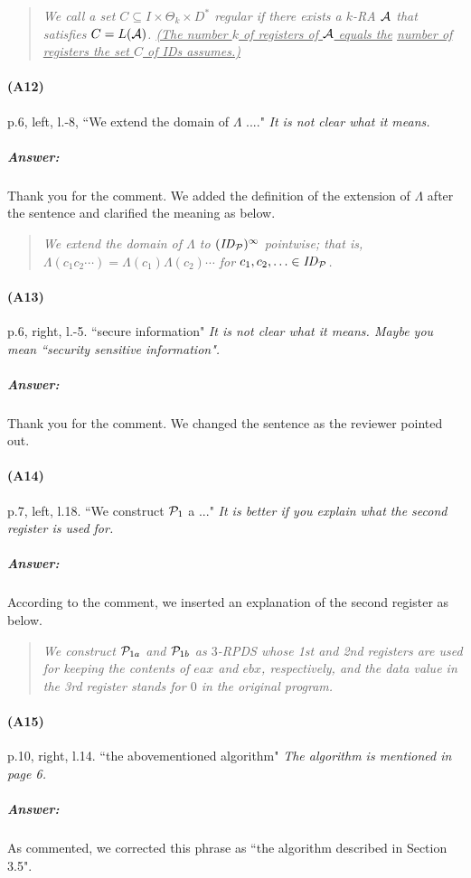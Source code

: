 \documentclass{article}
\begin{document}
\begin{quote}\em
We call a set $C\subseteq I\times\Theta_k\times D^*$ \emph{regular} if there exists a $k$-RA ${\cal A}$ that satisfies $C=L({\cal A})$.
\underline{(The number $k$ of registers of ${\cal A}$ equals the}
\underline{number of registers the set $C$ of IDs assumes.)}
\end{quote}

\paragraph{(A12)}  p.6, left, l.-8, ``We extend the domain of $\Lambda$ ...."\newline
\textit{
It is not clear what it means.
}
\subparagraph{Answer:}
Thank you for the comment. We added the definition of the extension of $\Lambda$ after the sentence and clarified the meaning as below.
\begin{quote}\em
  We extend the domain of $\Lambda$ to $(\mathit{ID}_{\cal P})^\infty$ pointwise;
  that is, $\Lambda(c_1c_2\cdots)=\Lambda(c_1)\Lambda(c_2)\cdots$ for
  $c_1,c_2,\ldots\in \mathit{ID}_{\cal P}$.
\end{quote}


\paragraph{(A13)} p.6, right, l.-5. ``secure information" \newline
\textit{
It is not clear what it means. Maybe you mean ``security sensitive information".
}
\subparagraph{Answer:}
Thank you for the comment. We changed the sentence as the reviewer pointed out.

\paragraph{(A14)} p.7, left, l.18. ``We construct ${\cal P}_1$ a ..."\newline
\textit{
It is better if you explain what the second register is used for.
}
\subparagraph{Answer:}
According to the comment, we inserted an explanation of the second register as below.
\begin{quote}\em
  We construct ${\cal P}_{1a}$ and ${\cal P}_{1b}$ as $3$-RPDS whose 1st and 2nd registers are used
  for keeping the contents of $\mathit{eax}$ and $\mathit{ebx}$, respectively,
  and the data value in the 3rd register stands for $0$ in the original program.
\end{quote}

\paragraph{(A15)} p.10, right, l.14. ``the abovementioned algorithm"\newline
\textit{
The algorithm is mentioned in page 6.
}
\subparagraph{Answer:}
As commented, we corrected this phrase as ``the algorithm described in Section 3.5".
\end{document}
